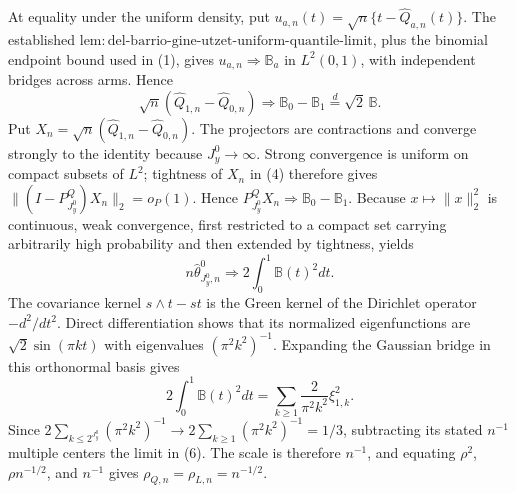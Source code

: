 At equality under the uniform density, put \(u_{a,n}(t)=\sqrt n\{t-\widehat Q_{a,n}(t)\}\). The established \(\mathrm{lem{:}del\text{-}barrio\text{-}gine\text{-}utzet\text{-}uniform\text{-}quantile\text{-}limit}\), plus the binomial endpoint bound used in (1), gives \(u_{a,n}\Rightarrow\mathbb B_a\) in \(L^2(0,1)\), with independent bridges across arms. Hence
\[
\sqrt n(\widehat Q_{1,n}-\widehat Q_{0,n})\Rightarrow\mathbb B_0-\mathbb B_1\stackrel d=\sqrt2\,\mathbb B. \tag{4}
\]
Put \(X_n=\sqrt n(\widehat Q_{1,n}-\widehat Q_{0,n})\). The projectors are contractions and converge strongly to the identity because \(J_y^0\to\infty\). Strong convergence is uniform on compact subsets of \(L^2\); tightness of \(X_n\) in (4) therefore gives \(\|(I-P^Q_{J_y^0})X_n\|_2=o_P(1)\). Hence \(P^Q_{J_y^0}X_n\Rightarrow\mathbb B_0-\mathbb B_1\). Because \(x\mapsto\|x\|_2^2\) is continuous, weak convergence, first restricted to a compact set carrying arbitrarily high probability and then extended by tightness, yields
\[
n\widehat\theta^0_{J_y^0,n}\Rightarrow2\int_0^1\mathbb B(t)^2dt.    \tag{5}
\]
The covariance kernel \(s\wedge t-st\) is the Green kernel of the Dirichlet operator \(-d^2/dt^2\). Direct differentiation shows that its normalized eigenfunctions are \(\sqrt2\sin(\pi kt)\) with eigenvalues \((\pi^2k^2)^{-1}\). Expanding the Gaussian bridge in this orthonormal basis gives
\[
2\int_0^1\mathbb B(t)^2dt=\sum_{k\ge1}\frac{2}{\pi^2k^2}\xi_{1,k}^2. \tag{6}
\]
Since \(2\sum_{k\le2^{J_y^0}}(\pi^2k^2)^{-1}\to2\sum_{k\ge1}(\pi^2k^2)^{-1}=1/3\), subtracting its stated \(n^{-1}\) multiple centers the limit in (6). The scale is therefore \(n^{-1}\), and equating \(\rho^2\), \(\rho n^{-1/2}\), and \(n^{-1}\) gives \(\rho_{Q,n}=\rho_{L,n}=n^{-1/2}\).